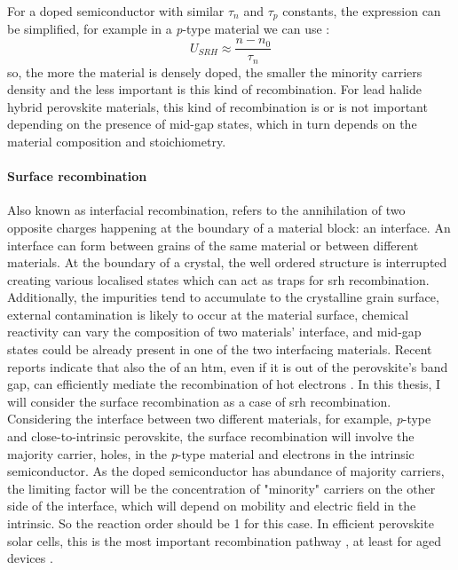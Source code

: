 		For a doped semiconductor with similar $\tau_n$ and $\tau_p$ constants, the expression can be simplified, for example in a \textit{p}-type material we can use \cite[108]{Nelson2003}:
		\begin{equation}
		U_{SRH} \approx \frac{n-n_0}{\tau_n}
		\end{equation}
		so, the more the material is densely doped, the smaller the minority carriers density and the less important is this kind of recombination.
		For lead halide hybrid perovskite materials, this kind of recombination is or is not important depending on the presence of mid-gap states, which in turn depends on the material composition and stoichiometry.

		\paragraph{Surface recombination}\label{intro_surface_recombination}
		Also known as interfacial recombination, refers to the annihilation of two opposite charges happening at the boundary of a material block: an interface.
		An interface can form between grains of the same material or between different materials.
		At the boundary of a crystal, the well ordered structure is interrupted creating various localised states which can act as traps for \gls{srh} recombination.
		Additionally, the impurities tend to accumulate to the crystalline grain surface, external contamination is likely to occur at the material surface, chemical reactivity can vary the composition of two materials' interface, and mid-gap states could be already present in one of the two interfacing materials.
		Recent reports indicate that also the  of an \gls{htm}, even if it is out of the perovskite's band gap, can efficiently mediate the recombination of hot electrons \cite{Jimenez-Lopez2018,Droseros2019}.
		In this thesis, I will consider the surface recombination as a case of \gls{srh} recombination.
		Considering the interface between two different materials, for example, \textit{p}-type  and close-to-intrinsic perovskite, the surface recombination will involve the majority carrier, holes, in the \textit{p}-type material and electrons in the intrinsic semiconductor.
		As the doped semiconductor has abundance of majority carriers, the limiting factor will be the concentration of "minority" carriers on the other side of the interface, which will depend on mobility and electric field in the intrinsic.
		So the reaction order should be 1 for this case.
		In efficient perovskite solar cells, this is the most important recombination pathway \cite{Calado2019,Carnie2015,Stolterfoht2018a}, at least for aged devices \cite{Tress2018,Correa-Baena2017a}.

